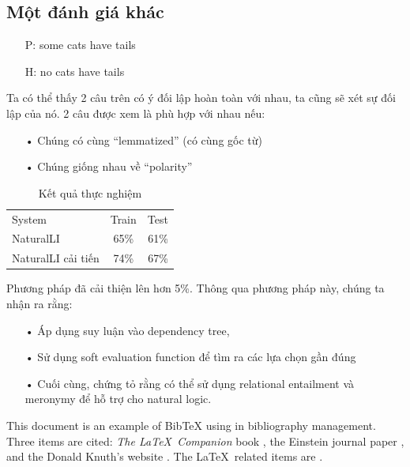 \documentclass[a4paper]{article}
\begin{document}
\subsection*{Một đánh giá khác}
\begin{itemize} 
\item[] P: some cats have tails 
\item[] H: no cats have tails
\end{itemize}
Ta có thể thấy 2 câu trên có ý đối lập hoàn toàn với nhau, ta cũng sẽ xét sự đối lập của nó.
2 câu được xem là phù hợp với nhau nếu:
\begin{itemize}
\item[•] Chúng có cùng “lemmatized” (có cùng gốc từ)
\item[•] Chúng giống nhau về “polarity” 
\end{itemize}

\begin{table}[!th]
\begin{center}
\begin{tabular}{|l|c|r|}
\hline
System & Train & Test \\
NaturalLI & 65\% & 61\% \\
NaturalLI cải tiến & 74\% & 67\% \\
\hline
\end{tabular}
\end{center}
\caption{Kết quả thực nghiệm}
\label{ex:table}
\end{table}

Phương pháp đã cải thiện lên hơn 5\%.
Thông qua phương pháp này, chúng ta nhận ra rằng:
\begin{itemize}
\item[•] Áp dụng suy luận vào dependency tree,
\item[•] Sử dụng soft evaluation function để tìm ra các lựa chọn gần đúng
\item[•] Cuối cùng, chứng tỏ rằng có thể sử dụng relational entailment và meronymy để hỗ trợ cho natural logic.
\end{itemize}
This document is an example of BibTeX using in bibliography management. Three items 
are cited: \textit{The \LaTeX\ Companion} book \cite{latexcompanion}, the Einstein
journal paper \cite{einstein}, and the Donald Knuth's website \cite{knuthwebsite}. 
The \LaTeX\ related items are \cite{latexcompanion,knuthwebsite}. 

\clearpage

\printbibliography[heading=subbibliography, title={Tài liệu tham khảo}]
\end{document}
